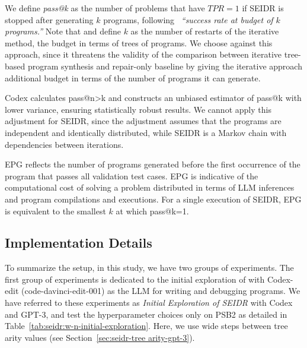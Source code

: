 We define \emph{pass@k} as the number of problems that have $TPR=1$ if SEIDR is stopped after generating $k$ programs, following~\cite{kulal2019:spoc} \emph{``success rate at budget of $k$ programs.''}
Note that \cite{jiangSelfEvolveCodeEvolution2023} and \cite{chenTeachingLargeLanguage2023} define $k$ as the number of restarts of the iterative method, the budget in terms of trees of programs.
We choose against this approach, since it threatens the validity of the comparison between iterative tree-based program synthesis and repair-only baseline by giving the iterative approach additional budget in terms of the number of programs it can generate.

Codex \cite{chenEvaluatingLargeLanguage2021} calculates pass@n>k and constructs an unbiased estimator of pass@k with lower variance, ensuring statistically robust results.
We cannot apply this adjustment for SEIDR, since the adjustment assumes that the programs are independent and identically distributed, while SEIDR is a Markov chain with dependencies between iterations. 

EPG reflects the number of programs generated before the first occurrence of the program that passes all validation test cases.
EPG is indicative of the computational cost of solving a problem distributed in terms of LLM inferences and program compilations and executions.
For a single execution of SEIDR, EPG is equivalent to the smallest $k$ at which pass@k=1.

\subsection{Implementation Details}
\label{sec:seidr-implementation}


To summarize the setup, in this study, we have two groups of experiments. 
% 
The first group of experiments is dedicated to the initial exploration of \rqtreearity{}
with Codex-edit (code-davinci-edit-001) as the LLM for writing and debugging programs. 
We have referred to these experiments as \emph{Initial Exploration of SEIDR} with Codex and GPT-3, and test the hyperparameter choices only on PSB2 as detailed in Table~\ref{tab:seidr:w-n-initial-exploration}.
Here, we use wide steps between tree arity values (see Section~\ref{sec:seidr-tree arity-gpt-3}).
 
